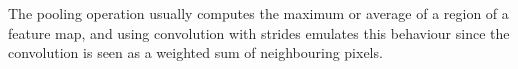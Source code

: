\documentclass[11pt]{article}
\begin{document}
The pooling operation usually computes the maximum or average of a region of
a feature map, and using convolution with strides emulates
this behaviour since the convolution
is seen as a weighted sum of neighbouring pixels.



%
%


\end{document}
